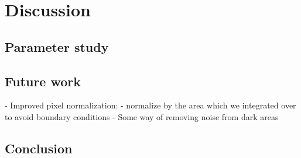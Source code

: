 \documentclass[thesis.tex]{subfiles}
\begin{document}
\chapter{Discussion}

\section{Parameter study}


\section{Future work}
- Improved pixel normalization:
	- normalize by the area which we integrated over to avoid boundary conditions
	- Some way of removing noise from dark areas


\section{Conclusion}

\subbibliography
\end{document}
